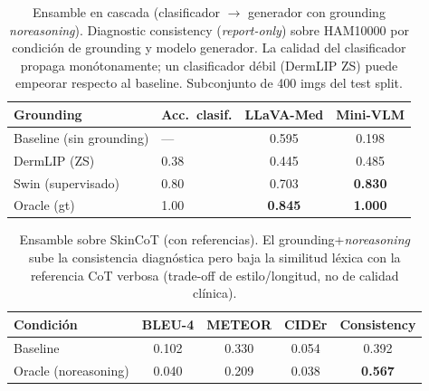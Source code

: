 \begin{table}[htbp]
  \centering
  \caption{Ensamble en cascada (clasificador $\rightarrow$ generador con grounding \textit{noreasoning}).
  Diagnostic consistency (\textit{report-only}) sobre HAM10000 por condición de grounding y modelo
  generador. La calidad del clasificador propaga monótonamente; un clasificador débil (DermLIP ZS)
  puede empeorar respecto al baseline. Subconjunto de 400 imgs del test split.}
  \label{tab:ensamble}
  \begin{tabular}{llcc}
    \toprule
    \textbf{Grounding} & \textbf{Acc.\ clasif.} & \textbf{LLaVA-Med} & \textbf{Mini-VLM} \\
    \midrule
    Baseline (sin grounding) & ---  & 0.595 & 0.198 \\
    DermLIP (ZS)             & 0.38 & 0.445 & 0.485 \\
    Swin (supervisado)       & 0.80 & 0.703 & \textbf{0.830} \\
    Oracle (gt)              & 1.00 & \textbf{0.845} & \textbf{1.000} \\
    \bottomrule
  \end{tabular}
\end{table}

\begin{table}[htbp]
  \centering
  \caption{Ensamble sobre SkinCoT (con referencias). El grounding+\textit{noreasoning} sube la
  consistencia diagnóstica pero baja la similitud léxica con la referencia CoT verbosa
  (trade-off de estilo/longitud, no de calidad clínica).}
  \label{tab:ensamble_skincot}
  \begin{tabular}{lcccc}
    \toprule
    \textbf{Condición} & \textbf{BLEU-4} & \textbf{METEOR} & \textbf{CIDEr} & \textbf{Consistency} \\
    \midrule
    Baseline           & 0.102 & 0.330 & 0.054 & 0.392 \\
    Oracle (noreasoning) & 0.040 & 0.209 & 0.038 & \textbf{0.567} \\
    \bottomrule
  \end{tabular}
\end{table}
